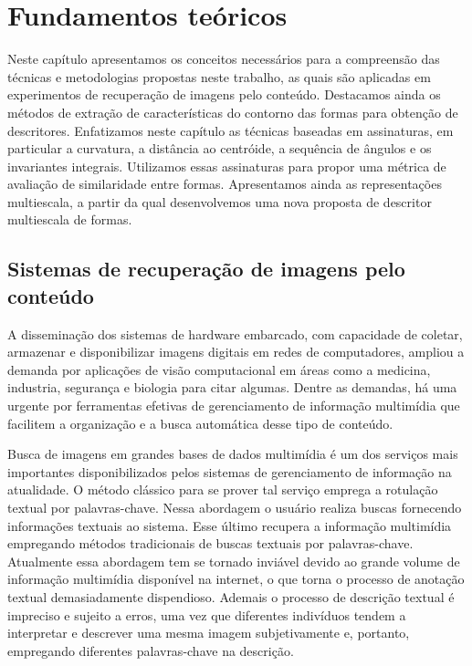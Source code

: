 
\chapter{Fundamentos teóricos}

Neste capítulo apresentamos os conceitos necessários para a compreensão das técnicas e metodologias propostas neste trabalho, as quais são aplicadas em experimentos de recuperação de imagens pelo conteúdo. Destacamos ainda os métodos de extração de características do contorno das formas para obtenção de descritores. Enfatizamos neste capítulo as técnicas baseadas em assinaturas, em particular a curvatura, a distância ao centróide, a sequência de ângulos e os invariantes integrais. Utilizamos essas assinaturas para propor uma métrica de avaliação de similaridade entre formas. Apresentamos ainda as representações multiescala, a partir da qual desenvolvemos uma nova proposta de descritor multiescala de formas.


\section{\label{chap:CBIR} Sistemas de recuperação de imagens pelo conteúdo}

A disseminação dos sistemas de hardware embarcado, com capacidade de coletar, armazenar e disponibilizar imagens digitais em redes de computadores, ampliou a demanda por aplicações de visão computacional em áreas como a medicina, industria, segurança e biologia para citar algumas. Dentre as demandas, há uma urgente por ferramentas efetivas de gerenciamento de informação multimídia que facilitem a organização e a busca automática desse tipo de conteúdo. 

Busca de imagens em grandes bases de dados multimídia é um dos serviços mais importantes disponibilizados pelos sistemas de gerenciamento de informação na atualidade. O método clássico para se prover tal serviço emprega a rotulação textual por palavras-chave. Nessa abordagem o usuário realiza buscas fornecendo informações textuais ao sistema. Esse último recupera a informação multimídia empregando métodos tradicionais de buscas textuais por palavras-chave. Atualmente essa abordagem tem se tornado inviável devido ao grande volume de informação multimídia disponível na internet, o que torna o processo de anotação textual demasiadamente dispendioso. Ademais o processo de descrição textual é impreciso e sujeito a erros, uma vez que diferentes indivíduos tendem a interpretar e descrever uma mesma imagem subjetivamente e, portanto, empregando diferentes palavras-chave na descrição.

